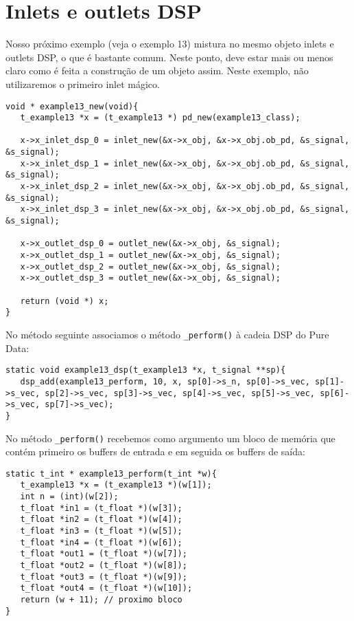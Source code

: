 \section{Inlets e outlets DSP}

Nosso próximo exemplo (veja o exemplo 13) mistura no mesmo objeto inlets e
outlets DSP, o que é bastante comum.
Neste ponto, deve estar mais ou menos claro como é feita a construção de um
objeto assim.
Neste exemplo, não utilizaremos o primeiro inlet mágico.

\begin{lstlisting}[caption=Criação de vários inlets e outlets DSP]
void * example13_new(void){
   t_example13 *x = (t_example13 *) pd_new(example13_class);

   x->x_inlet_dsp_0 = inlet_new(&x->x_obj, &x->x_obj.ob_pd, &s_signal, &s_signal);
   x->x_inlet_dsp_1 = inlet_new(&x->x_obj, &x->x_obj.ob_pd, &s_signal, &s_signal);
   x->x_inlet_dsp_2 = inlet_new(&x->x_obj, &x->x_obj.ob_pd, &s_signal, &s_signal);
   x->x_inlet_dsp_3 = inlet_new(&x->x_obj, &x->x_obj.ob_pd, &s_signal, &s_signal);

   x->x_outlet_dsp_0 = outlet_new(&x->x_obj, &s_signal);
   x->x_outlet_dsp_1 = outlet_new(&x->x_obj, &s_signal);
   x->x_outlet_dsp_2 = outlet_new(&x->x_obj, &s_signal);
   x->x_outlet_dsp_3 = outlet_new(&x->x_obj, &s_signal);

   return (void *) x;
}
\end{lstlisting}

No método seguinte associamos o método \texttt{\_perform()} à cadeia DSP do
Pure Data:

\begin{lstlisting}[caption=Método DSP para vários inlets e outlets DSP]
static void example13_dsp(t_example13 *x, t_signal **sp){
   dsp_add(example13_perform, 10, x, sp[0]->s_n, sp[0]->s_vec, sp[1]->s_vec, sp[2]->s_vec, sp[3]->s_vec, sp[4]->s_vec, sp[5]->s_vec, sp[6]->s_vec, sp[7]->s_vec);
}
\end{lstlisting}

No método \texttt{\_perform()} recebemos como argumento um bloco de memória
que contém primeiro os buffers de entrada e em seguida os buffers de saída:

\begin{lstlisting}[caption=Método Perform para vários inlets e outlets DSP]
static t_int * example13_perform(t_int *w){
   t_example13 *x = (t_example13 *)(w[1]);
   int n = (int)(w[2]);
   t_float *in1 = (t_float *)(w[3]);
   t_float *in2 = (t_float *)(w[4]);
   t_float *in3 = (t_float *)(w[5]);
   t_float *in4 = (t_float *)(w[6]);
   t_float *out1 = (t_float *)(w[7]);
   t_float *out2 = (t_float *)(w[8]);
   t_float *out3 = (t_float *)(w[9]);
   t_float *out4 = (t_float *)(w[10]);
   return (w + 11); // proximo bloco
}
\end{lstlisting}

